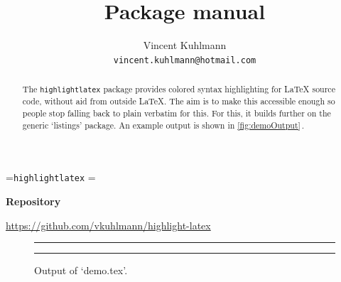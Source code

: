 \documentclass{ltxdoc}
\let\hll\lstinline
\begin{document}
\newbox\cmdintitle
\setbox\cmdintitle=\hbox{\hll|highlightlatex|}
\setbox\cmdintitle=\hbox{}

\title{Package \usebox\cmdintitle{} manual}
\author{
	Vincent Kuhlmann\\
	\texttt{vincent.kuhlmann@hotmail.com}
}


\maketitle
\begin{abstract}
	The \hll|highlightlatex| package provides colored syntax highlighting for \LaTeX{} source code,
	without aid from outside \LaTeX. The aim is to make this accessible enough so people stop
	falling back to plain verbatim for this. For this, it builds further on the generic `listings'
	package. An example output is	shown in \autoref{fig:demoOutput}\,.
\end{abstract}

\bigskip

\begin{center}
	{\small\textbf{Repository}}

	\url{https://github.com/vkuhlmann/highlight-latex}
\end{center}

\vspace{5\baselineskip}

\begin{figure}[htbp]
	\centering
	\rule{2cm}{1pt}

	\bigskip
	\caption{Output of `demo.tex'.}\label{fig:demoOutput}
	\bigskip
	\rule{2cm}{1pt}
\end{figure}
\end{document}

